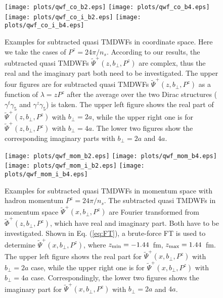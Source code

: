 \documentclass[prd,aps,twocolumn,preprintnumbers, showpacs, nofootinbib,superscriptaddress,notitlepage]{revtex4-1}
\begin{document}
\begin{widetext}

\begin{figure}
\centering
\texttt{[image: plots/qwf\_co\_b2.eps]}
\texttt{[image: plots/qwf\_co\_b4.eps]}
\texttt{[image: plots/qwf\_co\_i\_b2.eps]}
\texttt{[image: plots/qwf\_co\_i\_b4.eps]}
\caption{Examples for subtracted quasi TMDWFs in coordinate space. Here we take the cases of $P^z=24\pi/n_s$. According to our results, the subtracted quasi TMDWFs $\tilde{\Psi}^+(z,b_{\perp},P^z)$ are complex, thus the real and the imaginary part both need to be investigated. The upper four figures are for subtracted quasi TMDWFs $\tilde{\Psi}^+(z,b_{\perp},P^z)$ as a function of $\lambda=zP^z$ after the average over the two Dirac structures ($\gamma^t\gamma_5$ and $\gamma^z\gamma_5$) is taken. The upper left figure shows the real part of $\tilde{\Psi}^+(z,b_{\perp},P^z)$ with $b_{\perp}=2a$, while the upper right one is for $\tilde{\Psi}^+(z,b_{\perp},P^z)$ with $b_{\perp}=4a$. The lower two figures show the corresponding imaginary parts with $b_{\perp}=2a$ and $4a$.}
    \label{fig:qwf_co}
\end{figure}


\begin{figure}
\centering
\texttt{[image: plots/qwf\_mom\_b2.eps]}
\texttt{[image: plots/qwf\_mom\_b4.eps]}
\texttt{[image: plots/qwf\_mom\_i\_b2.eps]}
\texttt{[image: plots/qwf\_mom\_i\_b4.eps]}
\caption{Examples for subtracted quasi TMDWFs in momentum space with hadron momentum $P^z=24\pi/n_s$. The subtracted quasi TMDWFs in momentum space $\tilde{\Psi}^+(x,b_{\perp},P^z)$ are Fourier transformed from $\tilde{\Phi}^+(z,b_{\perp},P^z)$, which have real and imaginary part. Both have to be investigated. Shown in Eq. (\ref{eq:FT}), a brute-force FT is used to determine $\tilde{\Psi}^+(x,b_{\perp},P^z)$, where $z_{\rm min}=-1.44$~fm, $z_{\rm max}=1.44$~fm. The upper left figure shows the real part for $\tilde{\Psi}^+(x,b_{\perp},P^z)$ with $b_{\perp}=2a$ case, while the upper right one is for $\tilde{\Psi}^+(x,b_{\perp},P^z)$ with $b_{\perp}=4a$ case. Correspondingly, the lower two figures shows the imaginary part for $\tilde{\Psi}^+(x,b_{\perp},P^z)$ with $b_{\perp}=2a$ and $4a$.}
    \label{fig:qwf_momenta}
\end{figure}


\end{widetext}
 
\end{document}
